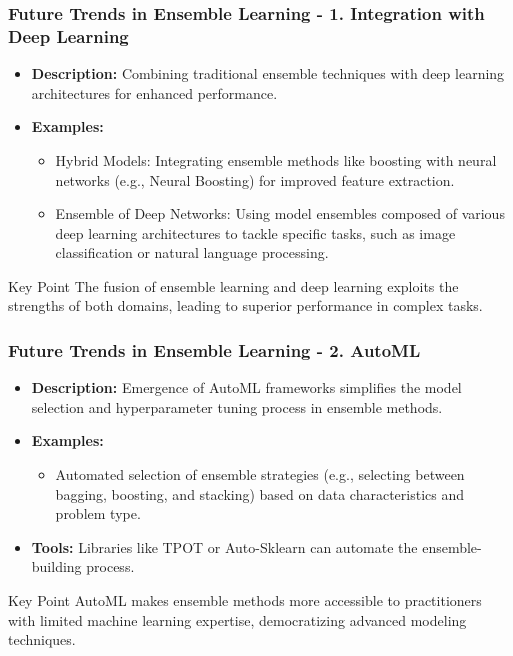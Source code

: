 \documentclass[aspectratio=169]{beamer}
\begin{document}
\begin{frame}[fragile]
    \frametitle{Future Trends in Ensemble Learning - 1. Integration with Deep Learning}
    \begin{itemize}
        \item \textbf{Description:} Combining traditional ensemble techniques with deep learning architectures for enhanced performance.
        \item \textbf{Examples:}
        \begin{itemize}
            \item Hybrid Models: Integrating ensemble methods like boosting with neural networks (e.g., Neural Boosting) for improved feature extraction.
            \item Ensemble of Deep Networks: Using model ensembles composed of various deep learning architectures to tackle specific tasks, such as image classification or natural language processing.
        \end{itemize}
    \end{itemize}
    \begin{block}{Key Point}
        The fusion of ensemble learning and deep learning exploits the strengths of both domains, leading to superior performance in complex tasks.
    \end{block}
\end{frame}

\begin{frame}[fragile]
    \frametitle{Future Trends in Ensemble Learning - 2. AutoML}
    \begin{itemize}
        \item \textbf{Description:} Emergence of AutoML frameworks simplifies the model selection and hyperparameter tuning process in ensemble methods.
        \item \textbf{Examples:}
        \begin{itemize}
            \item Automated selection of ensemble strategies (e.g., selecting between bagging, boosting, and stacking) based on data characteristics and problem type.
        \end{itemize}
        \item \textbf{Tools:} Libraries like TPOT or Auto-Sklearn can automate the ensemble-building process.
    \end{itemize}
    \begin{block}{Key Point}
        AutoML makes ensemble methods more accessible to practitioners with limited machine learning expertise, democratizing advanced modeling techniques.
    \end{block}
\end{frame}
\end{document}
